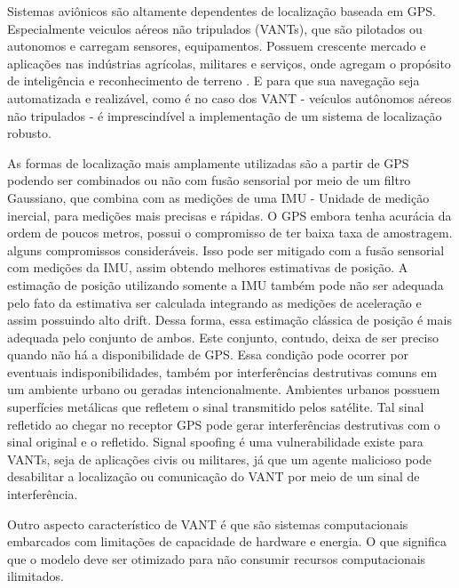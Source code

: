 















Sistemas aviônicos são altamente dependentes de localização baseada em GPS. Especialmente
veiculos aéreos não tripulados (VANTs), que são pilotados ou autonomos e carregam 
sensores, equipamentos. Possuem crescente mercado e aplicações nas indústrias agrícolas,
militares e serviços, onde agregam o propósito de inteligência e reconhecimento 
de terreno . E para que sua navegação seja automatizada e
realizável, como é no caso dos VANT \-- veículos autônomos aéreos não tripulados
\-- é imprescindível a implementação de um sistema de localização robusto.

As formas de localização mais amplamente utilizadas são a partir de GPS podendo
ser combinados ou não com fusão sensorial por meio de um filtro Gaussiano, que
combina com as medições de uma IMU \-- Unidade de medição inercial, para
medições mais precisas e rápidas. O GPS embora tenha acurácia da ordem de poucos
metros, possui o compromisso de ter baixa taxa de amostragem. alguns
compromissos consideráveis. Isso pode ser mitigado com a fusão sensorial com
medições da IMU, assim obtendo melhores estimativas de posição. A estimação de
posição utilizando somente a IMU também pode não ser adequada pelo fato da
estimativa ser calculada integrando as medições de aceleração e assim possuindo
alto drift. Dessa forma, essa estimação clássica de posição é mais adequada pelo
conjunto de ambos. Este conjunto, contudo, deixa de ser preciso quando não há a
disponibilidade de GPS. Essa condição pode ocorrer por eventuais
indisponibilidades, também por interferências destrutivas comuns em um ambiente
urbano ou geradas intencionalmente. Ambientes urbanos possuem superfícies
metálicas que refletem o sinal transmitido pelos satélite. Tal sinal refletido
ao chegar no receptor GPS pode gerar interferências destrutivas com o sinal
original e o refletido. Signal spoofing é uma vulnerabilidade existe para VANTs,
seja de aplicações civis ou militares, já que um agente malicioso pode
desabilitar a localização ou comunicação do VANT por meio de um sinal de
interferência.

Outro aspecto característico de VANT é que são sistemas computacionais embarcados com limitações de capacidade de hardware e energia. O que significa que o modelo deve ser otimizado para não consumir recursos computacionais ilimitados.

